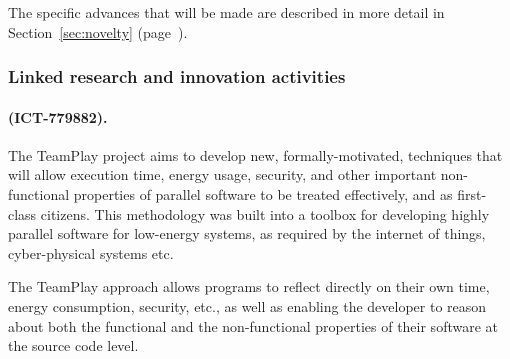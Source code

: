\documentclass[a4paper,11pt]{article}
\newcommand{\project}[1]{\textbf{#1}\xspace}
\newcommand{\SECURITY}{\project{Elysian}}
\newcommand{\TheProject}{\SECURITY}
\begin{document}
\noindent
The specific advances that will be made are described in more detail in Section~\ref{sec:novelty} (page~\pageref{sec:novelty}).


\subsubsection{Linked research and innovation activities}
\label{projects}



\begin{mdframed}[backgroundcolor=blue!5]
\paragraph{\teamplay (ICT-779882).}
The TeamPlay project aims to develop new, formally-motivated, techniques that will allow execution time, energy usage, security, and other important non-functional properties of parallel software to be treated effectively, and as first-class citizens. This methodology was built into a toolbox for developing highly parallel software for low-energy systems, as required by the internet of things, cyber-physical systems etc.

The TeamPlay approach allows programs to reflect directly on their own time, energy consumption, security, etc., as well as enabling the developer to reason about both the functional and the non-functional properties of their software at the source code level.
\end{mdframed}


\end{document}
